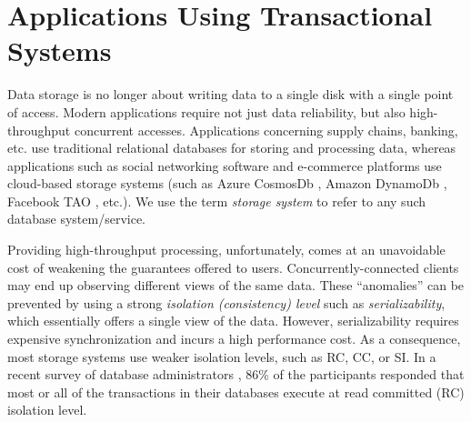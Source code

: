 \section{Applications Using Transactional Systems}

Data storage is no longer about writing data to a single
disk with a single point of access. Modern applications require not just data
reliability, but also high-throughput concurrent accesses. 
Applications concerning supply chains, banking, etc. use traditional relational databases
for storing and processing data, whereas applications such as social networking
software and e-commerce platforms 
use cloud-based storage systems (such as Azure CosmosDb \cite{cosmosdb}, Amazon DynamoDb
\cite{DBLP:conf/sosp/DeCandiaHJKLPSVV07}, Facebook TAO \cite{DBLP:conf/usenix/BronsonACCDDFGKLMPPSV13}, etc.). We use the term \textit{storage
system} to refer to any such database system/service.

Providing high-throughput processing, unfortunately, comes at an unavoidable cost of weakening 
the guarantees offered to users.
Concurrently-connected clients may end up observing different views of the same data. 
These ``anomalies'' can be prevented by using a strong \textit{isolation (consistency) level}  
such as \textit{serializability}, which essentially offers a single view of the
data. However, serializability requires expensive synchronization and incurs a high performance cost. 
As a consequence, most storage systems use weaker isolation levels, such as RC, CC, or SI. 
In a recent survey of
database administrators \cite{DBLP:conf/sigmod/Pavlo17}, 86\% of the participants responded that
most or all of the transactions in their databases execute at read committed (RC) isolation level.

